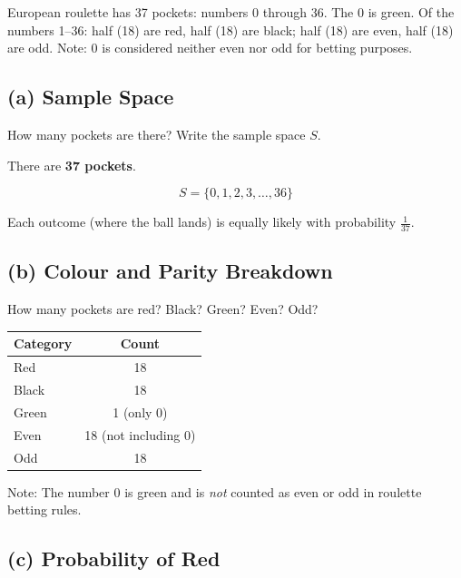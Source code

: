 \documentclass[11pt,a4paper]{article}
\begin{document}
European roulette has 37 pockets: numbers 0 through 36. The 0 is green. Of the numbers 1--36: half (18) are red, half (18) are black; half (18) are even, half (18) are odd. Note: 0 is considered neither even nor odd for betting purposes.

\subsection*{(a) Sample Space}

\begin{question}
How many pockets are there? Write the sample space $S$.
\end{question}

\begin{answer}
There are \textbf{37 pockets}.

\[
S = \{0, 1, 2, 3, \ldots, 36\}
\]

Each outcome (where the ball lands) is equally likely with probability $\frac{1}{37}$.
\end{answer}

\subsection*{(b) Colour and Parity Breakdown}

\begin{question}
How many pockets are red? Black? Green? Even? Odd?
\end{question}

\begin{answer}
\begin{center}
\begin{tabular}{|l|c|}
\hline
\textbf{Category} & \textbf{Count} \\
\hline
Red & 18 \\
\hline
Black & 18 \\
\hline
Green & 1 (only 0) \\
\hline
Even & 18 (not including 0) \\
\hline
Odd & 18 \\
\hline
\end{tabular}
\end{center}

Note: The number 0 is green and is \textit{not} counted as even or odd in roulette betting rules.
\end{answer}

\subsection*{(c) Probability of Red}
\end{document}

